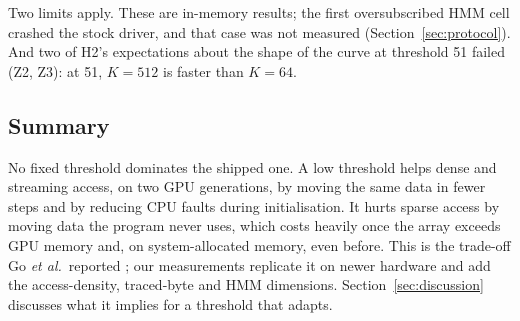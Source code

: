 Two limits apply. These are in-memory results; the first oversubscribed HMM
cell crashed the stock driver, and that case was not measured
(Section~\ref{sec:protocol}). And two of H2's expectations about the shape of
the curve at threshold 51 failed (Z2, Z3): at 51, $K = 512$ is faster than
$K = 64$.

\subsection{Summary}

No fixed threshold dominates the shipped one. A low threshold helps dense and
streaming access, on two GPU generations, by moving the same data in fewer
steps and by reducing CPU faults during initialisation. It hurts sparse access
by moving data the program never uses, which costs heavily once the array
exceeds GPU memory and, on system-allocated memory, even before. This is the
trade-off Go \emph{et al.}\ reported \cite{go2023earlyadaptor}; our measurements
replicate it on newer hardware and add the access-density, traced-byte and HMM
dimensions. Section~\ref{sec:discussion} discusses what it implies for a
threshold that adapts.
